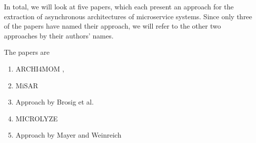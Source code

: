 
In total, we will look at five papers, which each present an approach for the extraction of asynchronous architectures of microservice systems.
Since only three of the papers have named their approach, we will refer to the other two approaches by their authors' names.

The papers are
\begin{enumerate}
	\item ARCHI4MOM \cite{Singh2022ARCHI4MOM}, \cite{Singh2021}
	\item MiSAR \cite{Alshuqayran2018MiSAR}
	\item Approach by Brosig et al. \cite{Brosig2011}
	\item MICROLYZE \cite{Kleehaus2018} %
	\item Approach by Mayer and Weinreich \cite{Mayer2018} %
\end{enumerate}